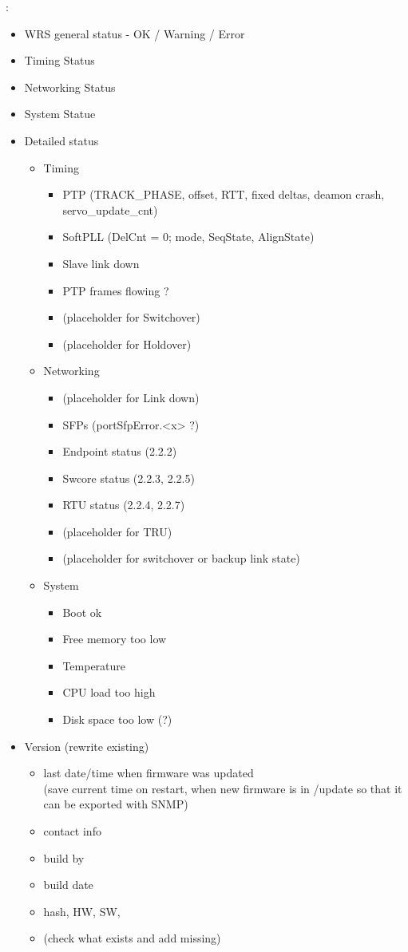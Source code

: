 :
\begin{itemize}%
  \item WRS general status - OK / Warning / Error
  \item Timing Status
  \item Networking Status
  \item System Statue
  \item Detailed status
  \begin{itemize}
    \item Timing
    \begin{itemize}
      \item PTP (TRACK\_PHASE, offset, RTT, fixed deltas, deamon crash,
        servo\_update\_cnt)
      \item SoftPLL (DelCnt = 0; mode, SeqState, AlignState)
      \item Slave link down
      \item PTP frames flowing ?
      \item (placeholder for Switchover)
      \item (placeholder for Holdover)
    \end{itemize}
    \item Networking
    \begin{itemize}
      \item (placeholder for Link down)
      \item SFPs (portSfpError.<x> ?)
      \item Endpoint status (2.2.2)
      \item Swcore status (2.2.3, 2.2.5)
      \item RTU status (2.2.4, 2.2.7)
      \item (placeholder for TRU)
      \item (placeholder for switchover or backup link state)
    \end{itemize}
    \item System
    \begin{itemize}
      \item Boot ok
      \item Free memory too low
      \item Temperature
      \item CPU load too high
      \item Disk space too low (?)
    \end{itemize}
  \end{itemize}
  \item Version (rewrite existing)
  \begin{itemize}
    \item last date/time when firmware was updated\\
      (save current time on restart, when new firmware is in /update so that it can be exported with SNMP)
    \item contact info
    \item build by
    \item build date
    \item hash, HW, SW,
    \item (check what exists and add missing)
  \end{itemize}
\end{itemize}
